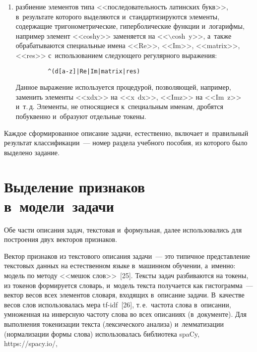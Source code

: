 \begin{multicols}{2}
\begin{enumerate}[(1)]
\noindent
Данное выражение позволяет выделить сле\-ду\-ющие типы токенов: 
пробельные символы, знаки пунктуации <<,>>, <<.>>, <<:>>; знаки операций 
<<$+$>>, <<$-$>>, <<$\backslash$>>, <<$<$>>, <<$>$>>; знаки ниж\-не\-го и~верх\-не\-го индекса <<\_>>, 
<<\!{\ptb{\^{\,}}}\!>>; скобки <<(>>, <<)>>, <<$\{$>>, <<$\}$>>, 
<<$\vert$>>; теги \TeX; целые и~вещественные чис\-ла;
\item разбиение элементов типа <<по\-сле\-до\-ва\-тель\-ность латинских букв>>, 
в~результате которого выделяются и~стандартизируются элементы, 
содержащие тригонометрические, \mbox{ги\-пер\-бо\-ли\-че\-ские} функ\-ции и~логарифмы, 
например элемент <<coshy>> заменяется на <<$\backslash\mathrm{cosh}$~y>>, 
а~также обрабатываются специальные имена <<Re>>, <<Im>>, <<matrix>>, 
<<res>> с~использованием сле\-ду\-юще\-го регулярного выражения:
{\small 
\begin{verbatim}
         ^(d[a-z]|Re|Im|matrix|res)
\end{verbatim}
}


\noindent
Данное выражение используется процедурой, поз\-во\-ля\-ющей, например, 
заменить элементы <<xdx>> на <<x~dx>>, <<Imz>> на <<Im~z>> и~т.\,д. 
Элементы, не относящиеся к~специальным именам, дробятся по\-бук\-вен\-но и~образуют отдельные токены.
\end{enumerate}

      Каждое сформированное описание задачи, естественно, включает 
и~правильный результат классификации~--- номер раздела учебного 
пособия, из которого было выделено задание.



\vspace*{-6pt}
      
      \section{Выделение признаков в~модели~задачи}
      
      \vspace*{-4pt}
      
      Обе части описания задач, текс\-то\-вая и~формульная, далее 
использовались для по\-стро\-ения двух векторов признаков.
      
      Вектор признаков из текстового описания задачи~--- это типичное 
пред\-став\-ле\-ние текс\-то\-вых данных на естественном языке в~машинном 
обуче\-нии, а~именно: модель по методу <<мешок слов>>~[25]. Тексты задач 
разбиваются на токены, из токенов формируется словарь, и~модель текс\-та 
получается как гис\-то\-грам\-ма~--- вектор весов всех элементов словаря, 
входящих в~описание задачи. В~качестве весов слов использовалась мера  
tf-idf~[26], т.\,е.\ час\-то\-та слова в~описании, умноженная на инверсную 
час\-то\-ту слова во всех описаниях (в~документе). Для выполнения токенизации 
текс\-та (лексического анализа) и~лемматизации (нормализации формы слова) 
использовалась биб\-лио\-те\-ка spaCy, {\sf https://spacy.io/},\linebreak\vspace*{-12pt}

\pagebreak

\end{multicols}

